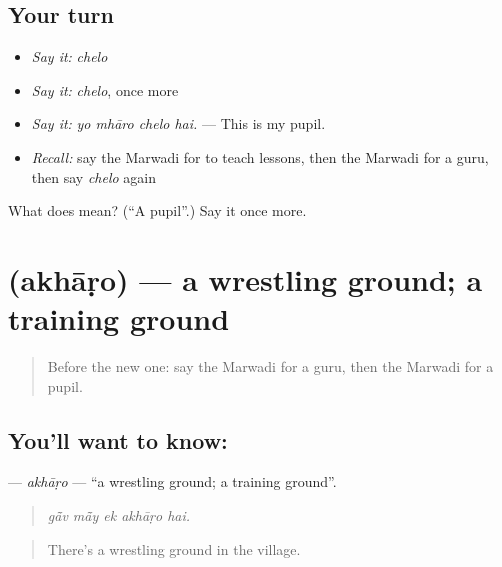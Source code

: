 \subsection*{Your turn}
\begin{itemize}
\raggedright
  \item \emph{Say it:} \emph{chelo}
  \item \emph{Say it:} \emph{chelo}, once more
  \item \emph{Say it:} \emph{yo mhāro chelo hai.} — This is my pupil.
  \item \emph{Recall:} say the Marwadi for to teach lessons, then the Marwadi for a guru, then say \emph{chelo} again
\end{itemize}

\begin{tcolorbox}[breakable,colback=teal!4,colframe=teal!35!black,title={Before you move on}]
What does  mean? (\textquotedblleft{}A pupil\textquotedblright{}.) Say it once more.
\end{tcolorbox}
\section[\texorpdfstring{\mw{अखाड़ो} (akhāṛo)}{अखाड़ो (akhāṛo)}]{ (akhāṛo) — a wrestling ground; a training ground}

\label{lesson:MW-C287-akharo}



\begin{quote}
Before the new one: say the Marwadi for a guru, then the Marwadi for a pupil.
\end{quote}

\subsection*{You'll want to know: }
\textbf{} — \emph{akhāṛo} — \textquotedblleft{}a wrestling ground; a training ground\textquotedblright{}.

\begin{quote}
    
\end{quote}

\begin{quote}
\emph{gā̃v mā̃y ek akhāṛo hai.}
\end{quote}

\begin{quote}
There's a wrestling ground in the village.
\end{quote}

